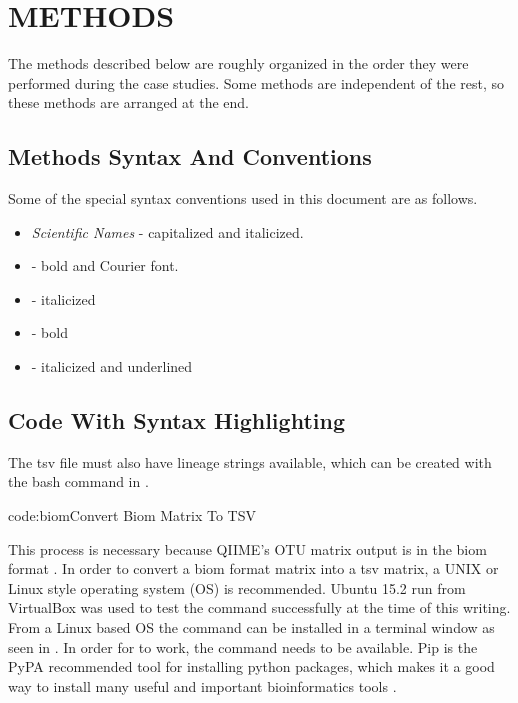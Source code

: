 
\chapter{METHODS}\label{ch:methods}

The methods described below are roughly organized in the order they were performed during the case studies. 
Some methods are independent of the rest, so these methods are arranged at the end.

\section{Methods Syntax And Conventions}

Some of the special syntax conventions used in this document are as follows.

\begin{itemize}
\item \textit{Scientific Names} - capitalized and italicized.
\item {} - bold and Courier font.
\item {} - italicized
\item {} - bold
\item {} - italicized and underlined
\end{itemize}

\clearpage %

\section{Code With Syntax Highlighting} \label{sec:code}
  
The tsv file must also have lineage strings available, which can be created with the bash command in .

          {code:biom}{Convert Biom Matrix To TSV}

This process is necessary because QIIME's OTU matrix output is in the biom format \cite{biom}.
In order to convert a biom format matrix into a tsv matrix, a UNIX or Linux style operating system (OS) is recommended. 
Ubuntu 15.2 run from VirtualBox \cite{virtualbox} was used to test the  command successfully at the time of this writing. 
From a Linux based OS the  command can be installed in a terminal window as seen in . 
In order for  to work, the  command needs to be available. 
Pip is the PyPA recommended tool for installing python packages, which makes it a good way to install many useful and important bioinformatics tools \cite{pip}.

